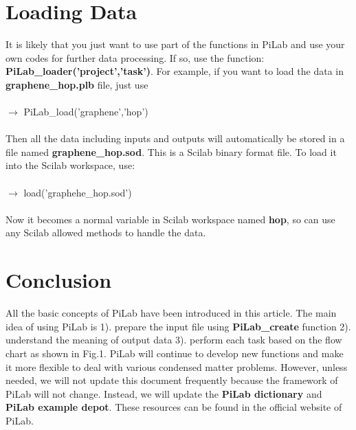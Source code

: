 \documentclass[10pt,a4paper]{article}
\begin{document}
\section{Loading Data}
It is likely that you just want to use part of the functions in PiLab and use your own codes for further data processing. If so, use the function: \textbf{PiLab\_loader('project','task')}. For example, if you want to load the data in \textbf{graphene\_hop.plb} file, just use\\ \\
$\rightarrow$ PiLab\_load('graphene','hop') \\ \\
Then all the data including inputs and outputs will automatically be stored in a file named \textbf{graphene\_hop.sod}. This is a Scilab binary format file. To load it into the Scilab workspace, use:\\ \\
$\rightarrow$ load('graphehe\_hop.sod') \\ \\
Now it becomes a normal variable in Scilab workspace named \textbf{hop}, so can use any Scilab allowed methods to handle the data.  
\section{Conclusion}
All the basic concepts of PiLab have been introduced in this article. The main idea of using PiLab is 1). prepare the input file using \textbf{PiLab\_create} function 2). understand the meaning of output data 3). perform each task based on the flow chart as shown in Fig.1. PiLab will continue to develop new functions and make it more flexible to deal with various condensed matter problems. However, unless needed, we will not update this document frequently because the framework of PiLab will not change. Instead, we will update the \textbf{PiLab dictionary} and \textbf{PiLab example depot}. These resources can be found in the official website of PiLab.

%
\end{document}
